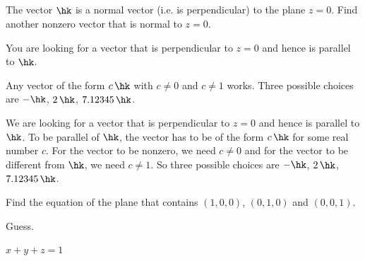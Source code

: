 


\subsection*{\Conceptual}

\begin{question}
The vector $\hk$ is a normal vector (i.e. is perpendicular) to the plane $z=0$. 
Find another nonzero vector that is normal to $z=0$.
\end{question}

\begin{hint}
You are looking for a vector that is perpendicular to $z=0$ and hence is
parallel to $\hk$. 
\end{hint}

\begin{answer}
Any vector of the form $c\,\hk$ with $c\ne 0$ and $c\ne 1$ works.
Three possible choices are $-\hk$, $2\,\hk$, $7.12345\,\hk$.
\end{answer}

\begin{solution}
We are looking for a vector that is perpendicular to $z=0$ and hence is
parallel to $\hk$. To be parallel of $\hk$, the vector has to be of the form $c\,\hk$ for some real number $c$.  For the vector to be nonzero, we need $c\ne 0$ and for the vector to be different from $\hk$, we need $c\ne 1$. So
three possible choices are $-\hk$, $2\,\hk$, $7.12345\,\hk$.
\end{solution}


\begin{question}[M200 2008A] \label{prob1.4_planeeqn} %
Find the equation of the plane that contains $(1,0,0)$, 
$(0,1,0)$ and $(0,0,1)$.
\end{question}

\begin{hint}
Guess.
\end{hint}

\begin{answer}
$x+y+z=1$
\end{answer}

